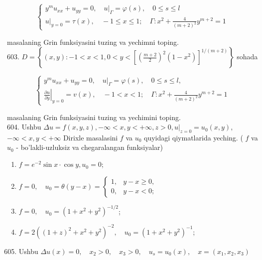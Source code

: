 \documentclass[10pt]{article}
\begin{document}
$$
\left\{\begin{array}{l}
y^{m} u_{x x}+u_{y y}=0,\left.\quad u\right|_{\Gamma}=\varphi(s), \quad 0 \leq s \leq l \\
\left.u\right|_{y=0}=\tau(x), \quad-1 \leq x \leq 1 ; \quad \Gamma: x^{2}+\frac{4}{(m+2)^{2}} y^{m+2}=1
\end{array}\right.
$$

masalaning Grin funksiyasini tuzing va yechimni toping.\\
603. $D=\left\{(x, y):-1<x<1,0<y<\left[\left(\frac{m+2}{2}\right)^{2}\left(1-x^{2}\right)\right]^{1 /(m+2)}\right\}$ sohada

$$
\left\{\begin{array}{l}
y^{m} u_{x x}+u_{y y}=0,\left.\quad u\right|_{\Gamma}=\varphi(s), \quad 0 \leq s \leq l, \\
\left.\frac{\partial u}{\partial y}\right|_{y=0}=v(x), \quad-1<x<1 ; \quad \Gamma: x^{2}+\frac{4}{(m+2)^{2}} y^{m+2}=1
\end{array}\right.
$$

masalaning Grin funksiyasini tuzing va yechimini toping.\\
604. Ushbu $\Delta u=f(x, y, z),-\infty<x, y<+\infty, z>0,\left.u\right|_{z=0}=u_{0}(x, y)$,\\
$-\infty<x, y<+\infty$ Dirixle masalasini $f$ va $u_{0}$ quyidagi qiymatlarida yeching. ( $f$ va $u_{0}$ - bo'lakli-uzluksiz va chegaralangan funksiyalar)

\begin{enumerate}
  \item $f=e^{-2} \sin x \cdot \cos y, u_{0}=0$;
  \item $f=0, \quad u_{0}=\theta(y-x)= \begin{cases}1, & y-x \geq 0, \\ 0, & y-x<0 ;\end{cases}$
  \item $f=0, \quad u_{0}=\left(1+x^{2}+y^{2}\right)^{-1 / 2}$;
  \item $f=2\left((1+z)^{2}+x^{2}+y^{2}\right)^{-2}, \quad u_{0}=\left(1+x^{2}+y^{2}\right)^{-1}$;
\end{enumerate}

\begin{enumerate}
  \setcounter{enumi}{604}
  \item Ushbu $\Delta u(x)=0, \quad x_{2}>0, \quad x_{3}>0, \quad u_{s}=u_{0}(x), \quad x=\left(x_{1}, x_{2}, x_{3}\right)$
\end{enumerate}
\end{document}
